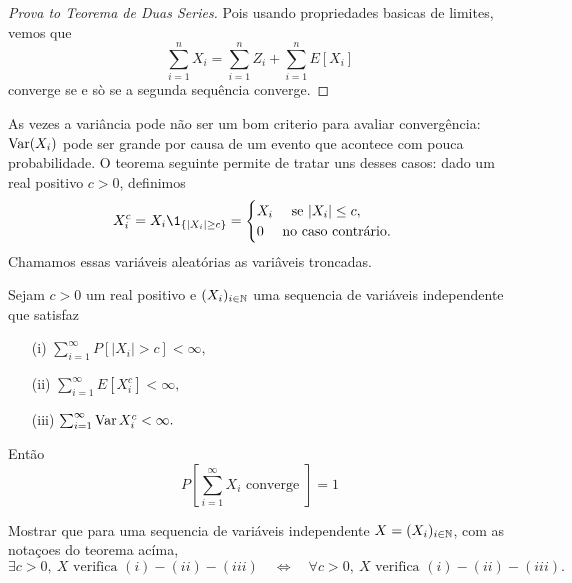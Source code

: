 \begin{topics}
\begin{proof}[Prova to Teorema de Duas Series]
  \medskip

  Pois usando propriedades basicas de limites, vemos que $$\sum_{i=1}^n X_i=\sum_{i=1}^n Z_i+ \sum_{i=1}^n E[X_i]$$ converge se e sò se a segunda sequência converge.
\end{proof}

As vezes a variância pode não ser um bom criterio para avaliar convergência: $\operatorname{Var}(X_i)$ pode ser grande por causa de um evento que
acontece com pouca probabilidade. O teorema seguinte permite de tratar uns desses casos:
dado um real positivo $c>0$, definimos
\begin{equation}
X_i^c= X_i \1_{\{|X_i| \ge c\}}= \begin{cases} X_i \quad \text{ se } |X_i|\le c,\\
                                    0 \quad \text{ no caso contrário.}
                                   \end{cases}
           \end{equation}
Chamamos essas variáveis aleatórias as variâveis troncadas.

\begin{theorem}
 Sejam $c>0$ um real positivo e $(X_i)_{i\in {\ensuremath{\mathbb N}}}$ uma sequencia de variáveis independente que
satisfaz
\begin{itemize}
 \item [(i)]  $\sum_{i=1}^\infty P[ |X_i|>c ]<\infty,$
 \item [(ii)]  $\sum_{i=1}^\infty E[ X^c_i]<\infty,$
 \item [(iii)]  $\sum_{i=1}^\infty \operatorname{Var} X^c_i<\infty.$
\end{itemize}
Então
$$ P[\sum_{i=1}^{\infty} X_i \text{ converge } ]= 1 $$
\end{theorem}

\begin{exercise}
  Mostrar que para uma sequencia de variáveis independente $X=(X_i)_{i\in {\ensuremath{\mathbb N}}}$, com as notaçoes do teorema acíma,
  \begin{equation*}
    \exists c>0,\ X \text{ verifica $(i)-(ii)-(iii)$}
    \quad \Leftrightarrow \quad
    \forall c>0,\ X \text{ verifica $(i)-(ii)-(iii)$}.
  \end{equation*}
\end{exercise}


\end{topics}
